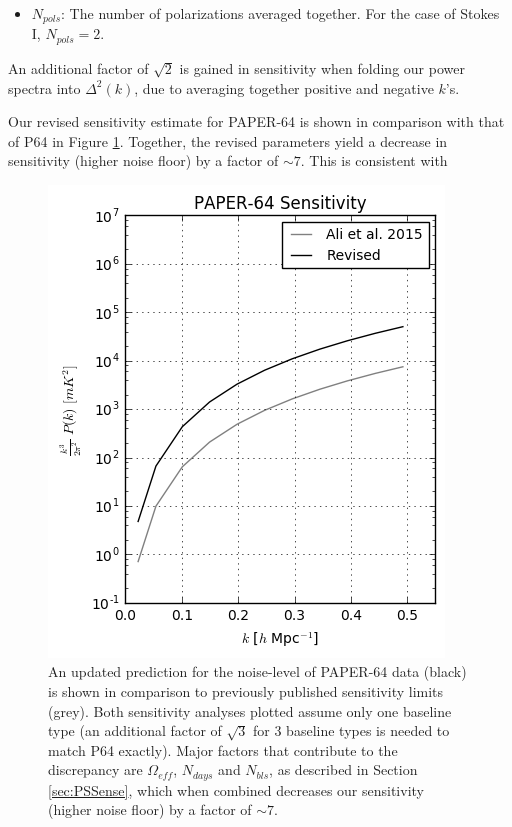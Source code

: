 \documentclass[preprint2,numberedappendix,tighten]{aastex6}  %
\begin{document}
\begin{itemize}
\item $N_{pols}$: The number of polarizations averaged together. For the case of Stokes I, $N_{pols}=2$.
\end{itemize}

An additional factor of $\sqrt{2}$ is gained in sensitivity when folding our power spectra into $\Delta^{2}(k)$, due to averaging together positive and negative $k$'s. 

Our revised sensitivity estimate for PAPER-64 is shown in comparison with that of P64 in Figure \ref{fig:sense_check}. Together, the revised parameters yield a decrease in sensitivity (higher noise floor) by a factor of $\sim7$. This is consistent with 

\begin{figure}
	\centering
	\includegraphics[width=\columnwidth]{plots/sense_check.png}
	\caption{An updated prediction for the noise-level of PAPER-64 data (black) is shown in comparison to previously published sensitivity limits (grey). Both sensitivity analyses plotted assume only one baseline type (an additional factor of $\sqrt{3}$ for 3 baseline types is needed to match P64 exactly). Major factors that contribute to the discrepancy are $\Omega_{eff}$, $N_{days}$ and $N_{bls}$, as described in Section \ref{sec:PSSense}, which when combined decreases our sensitivity (higher noise floor) by a factor of $\sim7$.}
	\label{fig:sense_check}
\end{figure}
\end{document}
